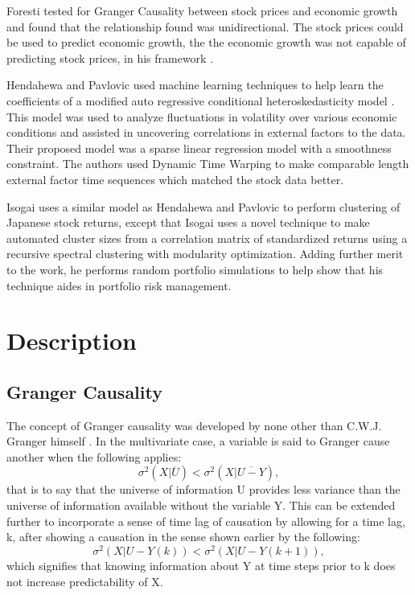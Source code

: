 \documentclass[conference]{IEEEtran}
\begin{document}
 Foresti tested for Granger Causality between stock prices and economic growth and found that the relationship found was unidirectional. The stock prices could be used to predict economic growth, the the economic growth was not capable of predicting stock prices, in his framework \cite{Foresti}.
 
 Hendahewa and Pavlovic used machine learning techniques to help learn the coefficients of a modified auto regressive conditional heteroskedasticity model \cite{Henda}. This model was used to analyze fluctuations in volatility over various economic conditions and assisted in uncovering correlations in external factors to the data. Their proposed model was a sparse linear regression model with a smoothness constraint. The authors used Dynamic Time Warping to make comparable length external factor time sequences which matched the stock data better.
 
 Isogai uses a similar model as Hendahewa and Pavlovic to perform clustering of Japanese stock returns, except that Isogai uses a novel technique to make automated cluster sizes from a correlation matrix of standardized returns using a recursive spectral clustering with modularity optimization. Adding further merit to the work, he performs random portfolio simulations to help show that his technique aides in portfolio risk management.



\section{Description}
\subsection{Granger Causality}
The concept of Granger causality was developed by none other than C.W.J. Granger himself \cite{Granger}. In the multivariate case, a variable is said to Granger cause another when the following applies:
$$ \sigma^2(X|\overline{U}) < \sigma^2(X|\overline{U-Y}),$$
 that is to say that the universe of information U provides less variance than the universe of information available without the variable Y. This can be extended further to incorporate a sense of time lag of causation by allowing for a time lag, k, after showing a causation in the sense shown earlier by the following:
$$ \sigma^2(X|U-Y(k)) < \sigma^2(X|U-Y(k+1)),$$ 
which signifies that knowing information about Y at time steps prior to k does not increase predictability of X. 
\end{document}
